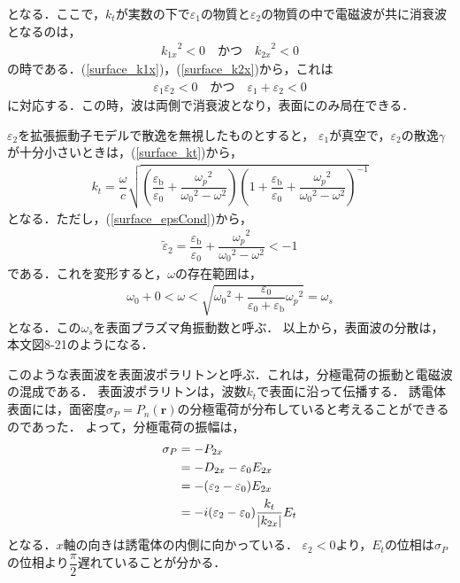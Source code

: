 となる．ここで，$k_t$が実数の下で$\varepsilon_1$の物質と$\varepsilon_2$の物質の中で電磁波が共に消衰波となるのは，
\begin{align}
  {k_{1x}}^2 < 0 \quad \text{かつ} \quad {k_{2x}}^2 < 0
\end{align}
の時である．(\ref{surface_k1x})，(\ref{surface_k2x})から，これは
\begin{align}
  \varepsilon_1\varepsilon_2 < 0　\quad \text{かつ} \quad \varepsilon_1+\varepsilon_2 < 0\label{surface_epsCond}
\end{align}
に対応する．この時，波は両側で消衰波となり，表面にのみ局在できる．

$\varepsilon_2$を拡張振動子モデルで散逸を無視したものとすると，
$\varepsilon_1$が真空で，$\varepsilon_2$の散逸$\gamma$が十分小さいときは，(\ref{surface_kt})から，
\begin{align}
  k_t=\dfrac{\omega}{c}\sqrt{\left(\dfrac{\varepsilon_{\text{b}}}{\varepsilon_0}+\dfrac{{\omega_p}^2}{{\omega_0}^2-\omega^2}\right)
  \left(1+\dfrac{\varepsilon_{\text{b}}}{\varepsilon_0}+\dfrac{{\omega_p}^2}{{\omega_0}^2-\omega^2}\right)^{-1}}
\end{align}
となる．ただし，(\ref{surface_epsCond})から，
\begin{align}
  \tilde{\varepsilon}_2=\dfrac{\varepsilon_{\text{b}}}{\varepsilon_0}+\dfrac{{\omega_p}^2}{{\omega_0}^2-\omega^2} < -1
\end{align}
である．これを変形すると，$\omega$の存在範囲は，
\begin{align}
  \omega_0+0 < \omega < \sqrt{{\omega_0}^2+\dfrac{\varepsilon_0}{\varepsilon_0+\varepsilon_{\text {b}}}{\omega_p}^2}=\omega_s
\end{align}
となる．この$\omega_s$を表面プラズマ角振動数と呼ぶ．
以上から，表面波の分散は，本文図8-21のようになる．

このような表面波を表面波ポラリトンと呼ぶ．これは，分極電荷の振動と電磁波の混成である．
表面波ポラリトンは，波数$k_t$で表面に沿って伝播する．
誘電体表面には，面密度$\sigma_P=P_n(\boldsymbol{r})$の分極電荷が分布していると考えることができるのであった．
よって，分極電荷の振幅は，
\begin{align}
  \sigma_P&=-P_{2x}\notag\\
  &=-D_{2x}-\varepsilon_0E_{2x}\notag\\
  &=-(\varepsilon_2-\varepsilon_0)E_{2x}\notag\\
  &=-i(\varepsilon_2-\varepsilon_0)\dfrac{k_t}{|k_{2x}|}E_t
\end{align}
となる．$x$軸の向きは誘電体の内側に向かっている．
$\varepsilon_2 < 0$より，$E_t$の位相は$\sigma_P$の位相より$\dfrac{\pi}{2}$遅れていることが分かる．
